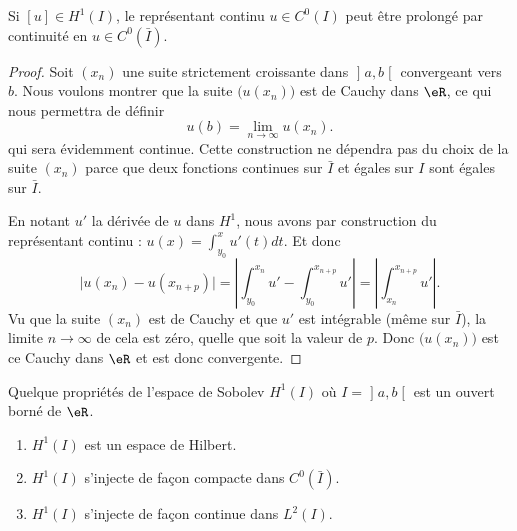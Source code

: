 \begin{corollary}   \label{CorCEPJGAu}
    Si \( [u]\in H^1(I)\), le représentant continu \( u\in C^0(I)\) peut être prolongé par continuité en \( u\in C^0(\bar I)\).
\end{corollary}

\begin{proof}
    Soit \( (x_n)\) une suite strictement croissante dans \( \mathopen] a , b \mathclose[\) convergeant vers \( b\). Nous voulons montrer que la suite \( \big( u(x_n) \big)\) est de Cauchy dans \( \eR\), ce qui nous permettra de définir
        \begin{equation}
            u(b)=\lim_{n\to \infty} u(x_n).
        \end{equation}
        qui sera évidemment continue. Cette construction ne dépendra pas du choix de la suite \( (x_n)\) parce que deux fonctions continues sur \( \bar I\) et égales sur \( I\) sont égales sur \( \bar I\).

        En notant \( u'\) la dérivée de \( u\) dans \( H^1\), nous avons par construction du représentant continu : \( u(x)=\int_{y_0}^xu'(t)dt\). Et donc
        \begin{equation}
            \big| u(x_n)-u(x_{n+p}) \big|=\left| \int_{y_0}^{x_n}u'-\int_{y_0}^{x_{n+p}}u' \right| =\left| \int_{x_n}^{x_{n+p}}u' \right| .
        \end{equation}
        Vu que la suite \( (x_n)\) est de Cauchy et que \( u'\) est intégrable (même sur \( \bar I\)), la limite \( n\to\infty\) de cela est zéro, quelle que soit la valeur de \( p\). Donc \( \big( u(x_n) \big)\) est ce Cauchy dans \( \eR\) et est donc convergente.
\end{proof}

\begin{proposition}     \label{ThoESIyxfU}
    Quelque propriétés de l'espace de Sobolev \( H^1(I)\) où \( I=\mathopen] a , b \mathclose[\) est un ouvert borné de \( \eR\).
    \begin{enumerate}
        \item
            \( H^1(I)\) est un espace de Hilbert.
        \item
            \( H^1(I)\) s'injecte de façon compacte dans \( C^0(\bar I)\).
        \item
            \( H^1(I)\) s'injecte de façon continue dans \( L^2(I)\).
    \end{enumerate}
\end{proposition}


